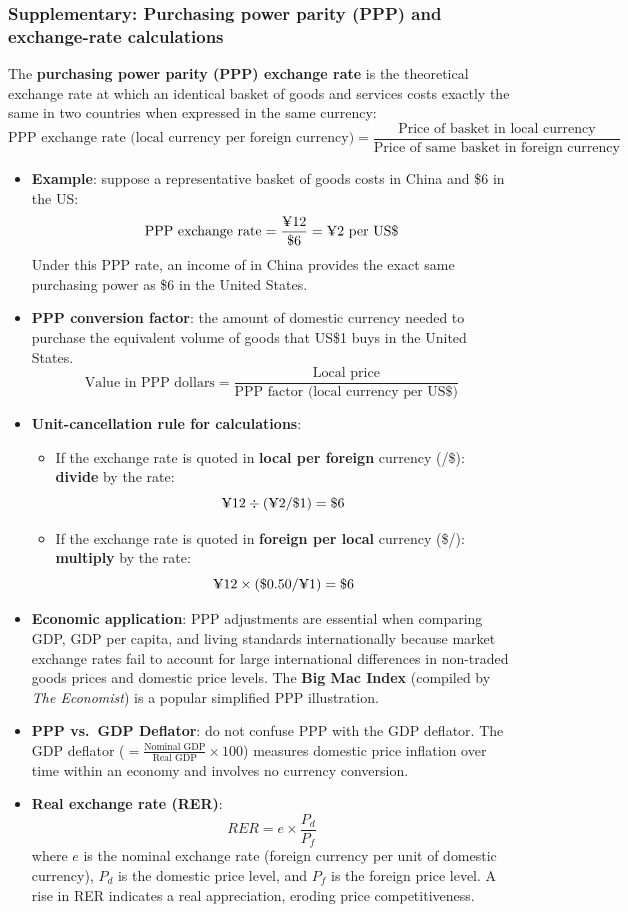 \documentclass[a4paper,12pt]{article}
\newcommand{\needbold}[1]{\textcolor{red!70!black}{\textbf{#1}}}
\begin{document}
\subsubsection*{Supplementary: Purchasing power parity (PPP) and exchange-rate calculations}
The \needbold{purchasing power parity (PPP) exchange rate} is the theoretical exchange rate at which an identical basket of goods and services costs exactly the same in two countries when expressed in the same currency:
\[\text{PPP exchange rate (local currency per foreign currency)} = \dfrac{\text{Price of basket in local currency}}{\text{Price of same basket in foreign currency}}\]
\begin{itemize}
  \item \textbf{Example}: suppose a representative basket of goods costs  in China and \$6 in the US:
  \[\text{PPP exchange rate} = \dfrac{\text{\textyen}12}{\$6} = \text{\textyen}2 \text{ per US\$}\]
  Under this PPP rate, an income of  in China provides the exact same purchasing power as \$6 in the United States.
  \item \needbold{PPP conversion factor}: the amount of domestic currency needed to purchase the equivalent volume of goods that US\$1 buys in the United States.
  \[\text{Value in PPP dollars} = \dfrac{\text{Local price}}{\text{PPP factor (local currency per US\$)}}\]
  \item \textbf{Unit-cancellation rule for calculations}:
  \begin{itemize}
    \item If the exchange rate is quoted in \textbf{local per foreign} currency (\textyen/\$): \textbf{divide} by the rate:
    \[\text{\textyen}12 \div (\text{\textyen}2 / \$1) = \$6\]
    \item If the exchange rate is quoted in \textbf{foreign per local} currency (\$/\textyen): \textbf{multiply} by the rate:
    \[\text{\textyen}12 \times (\$0.50 / \text{\textyen}1) = \$6\]
  \end{itemize}
  \item \textbf{Economic application}: PPP adjustments are essential when comparing GDP, GDP per capita, and living standards internationally because market exchange rates fail to account for large international differences in non-traded goods prices and domestic price levels. The \textbf{Big Mac Index} (compiled by \textit{The Economist}) is a popular simplified PPP illustration.
  \item \textbf{PPP vs.\ GDP Deflator}: do not confuse PPP with the GDP deflator. The GDP deflator ($= \frac{\text{Nominal GDP}}{\text{Real GDP}} \times 100$) measures domestic price inflation over time within an economy and involves no currency conversion.
  \item \textbf{Real exchange rate (RER)}:
  \[RER = e \times \dfrac{P_d}{P_f}\]
  where $e$ is the nominal exchange rate (foreign currency per unit of domestic currency), $P_d$ is the domestic price level, and $P_f$ is the foreign price level. A rise in RER indicates a real appreciation, eroding price competitiveness.
\end{itemize}
\end{document}
